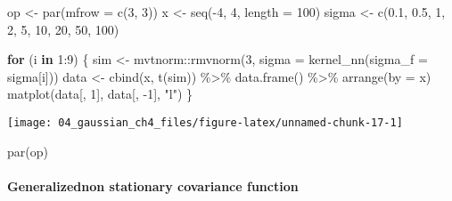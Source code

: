 \documentclass[
]{article}
\newenvironment{Shaded}{\begin{snugshade}}{\end{snugshade}}
\newcommand{\AttributeTok}[1]{\textcolor[rgb]{0.77,0.63,0.00}{#1}}
\newcommand{\ControlFlowTok}[1]{\textcolor[rgb]{0.13,0.29,0.53}{\textbf{#1}}}
\newcommand{\DecValTok}[1]{\textcolor[rgb]{0.00,0.00,0.81}{#1}}
\newcommand{\FloatTok}[1]{\textcolor[rgb]{0.00,0.00,0.81}{#1}}
\newcommand{\FunctionTok}[1]{\textcolor[rgb]{0.00,0.00,0.00}{#1}}
\newcommand{\NormalTok}[1]{#1}
\newcommand{\OtherTok}[1]{\textcolor[rgb]{0.56,0.35,0.01}{#1}}
\newcommand{\SpecialCharTok}[1]{\textcolor[rgb]{0.00,0.00,0.00}{#1}}
\newcommand{\StringTok}[1]{\textcolor[rgb]{0.31,0.60,0.02}{#1}}
\begin{document}
\begin{Shaded}
\begin{Highlighting}[]
\NormalTok{op }\OtherTok{\textless{}{-}} \FunctionTok{par}\NormalTok{(}\AttributeTok{mfrow =} \FunctionTok{c}\NormalTok{(}\DecValTok{3}\NormalTok{, }\DecValTok{3}\NormalTok{))}
\NormalTok{x }\OtherTok{\textless{}{-}} \FunctionTok{seq}\NormalTok{(}\SpecialCharTok{{-}}\DecValTok{4}\NormalTok{, }\DecValTok{4}\NormalTok{, }\AttributeTok{length =} \DecValTok{100}\NormalTok{)}
\NormalTok{sigma }\OtherTok{\textless{}{-}} \FunctionTok{c}\NormalTok{(}\FloatTok{0.1}\NormalTok{, }\FloatTok{0.5}\NormalTok{, }\DecValTok{1}\NormalTok{, }
           \DecValTok{2}\NormalTok{, }\DecValTok{5}\NormalTok{, }\DecValTok{10}\NormalTok{, }
           \DecValTok{20}\NormalTok{, }\DecValTok{50}\NormalTok{, }\DecValTok{100}\NormalTok{)}

\ControlFlowTok{for}\NormalTok{ (i }\ControlFlowTok{in} \DecValTok{1}\SpecialCharTok{:}\DecValTok{9}\NormalTok{) \{}
\NormalTok{  sim }\OtherTok{\textless{}{-}}\NormalTok{ mvtnorm}\SpecialCharTok{::}\FunctionTok{rmvnorm}\NormalTok{(}\DecValTok{3}\NormalTok{, }\AttributeTok{sigma =} \FunctionTok{kernel\_nn}\NormalTok{(}\AttributeTok{sigma\_f =}\NormalTok{ sigma[i]))}
\NormalTok{  data }\OtherTok{\textless{}{-}} \FunctionTok{cbind}\NormalTok{(x, }\FunctionTok{t}\NormalTok{(sim)) }\SpecialCharTok{\%\textgreater{}\%} 
    \FunctionTok{data.frame}\NormalTok{() }\SpecialCharTok{\%\textgreater{}\%}
    \FunctionTok{arrange}\NormalTok{(}\AttributeTok{by =}\NormalTok{ x)}
  \FunctionTok{matplot}\NormalTok{(data[, }\DecValTok{1}\NormalTok{], data[, }\SpecialCharTok{{-}}\DecValTok{1}\NormalTok{], }\StringTok{"l"}\NormalTok{)}
\NormalTok{\}}
\end{Highlighting}
\end{Shaded}

\begin{center}\texttt{[image: 04\_gaussian\_ch4\_files/figure-latex/unnamed-chunk-17-1]} \end{center}

\begin{Shaded}
\begin{Highlighting}[]
\FunctionTok{par}\NormalTok{(op)}
\end{Highlighting}
\end{Shaded}

\hypertarget{generalizednon-stationary-covariance-function}{%
\paragraph{Generalizednon stationary covariance
function}\label{generalizednon-stationary-covariance-function}}
\end{document}
